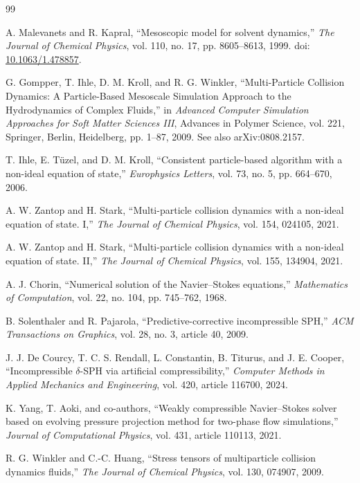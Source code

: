 \documentclass[11pt,a4paper]{article}
\begin{document}
\begin{thebibliography}{99}

A. Malevanets and R. Kapral,
``Mesoscopic model for solvent dynamics,''
\emph{The Journal of Chemical Physics}, vol. 110, no. 17, pp. 8605--8613, 1999.
doi: \href{https://doi.org/10.1063/1.478857}{10.1063/1.478857}.

G. Gompper, T. Ihle, D. M. Kroll, and R. G. Winkler,
``Multi-Particle Collision Dynamics: A Particle-Based Mesoscale Simulation Approach to the Hydrodynamics of Complex Fluids,''
in \emph{Advanced Computer Simulation Approaches for Soft Matter Sciences III},
Advances in Polymer Science, vol. 221, Springer, Berlin, Heidelberg, pp. 1--87, 2009.
See also arXiv:0808.2157.

T. Ihle, E. Tüzel, and D. M. Kroll,
``Consistent particle-based algorithm with a non-ideal equation of state,''
\emph{Europhysics Letters}, vol. 73, no. 5, pp. 664--670, 2006.

A. W. Zantop and H. Stark,
``Multi-particle collision dynamics with a non-ideal equation of state. I,''
\emph{The Journal of Chemical Physics}, vol. 154, 024105, 2021.

A. W. Zantop and H. Stark,
``Multi-particle collision dynamics with a non-ideal equation of state. II,''
\emph{The Journal of Chemical Physics}, vol. 155, 134904, 2021.

A. J. Chorin,
``Numerical solution of the Navier--Stokes equations,''
\emph{Mathematics of Computation}, vol. 22, no. 104, pp. 745--762, 1968.

B. Solenthaler and R. Pajarola,
``Predictive-corrective incompressible SPH,''
\emph{ACM Transactions on Graphics}, vol. 28, no. 3, article 40, 2009.

J. J. De Courcy, T. C. S. Rendall, L. Constantin, B. Titurus, and J. E. Cooper,
``Incompressible $\delta$-SPH via artificial compressibility,''
\emph{Computer Methods in Applied Mechanics and Engineering}, vol. 420, article 116700, 2024.

K. Yang, T. Aoki, and co-authors,
``Weakly compressible Navier--Stokes solver based on evolving pressure projection method for two-phase flow simulations,''
\emph{Journal of Computational Physics}, vol. 431, article 110113, 2021.

R. G. Winkler and C.-C. Huang,
``Stress tensors of multiparticle collision dynamics fluids,''
\emph{The Journal of Chemical Physics}, vol. 130, 074907, 2009.


\end{thebibliography}
\end{document}
